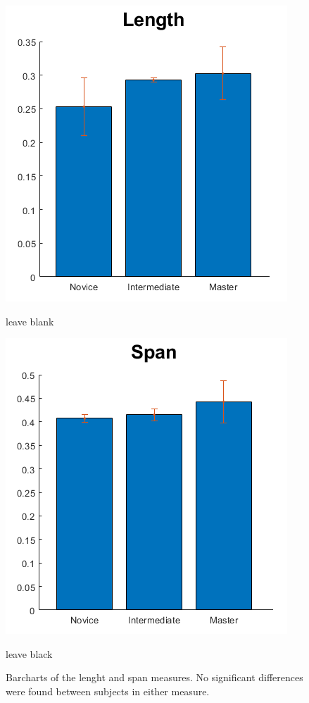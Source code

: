 \begin{figure}[H]
	\hfill
	{%
		\begin{minipage}{0.46\linewidth}
			\includegraphics[width=\linewidth]{figures/Length}
			\caption{leave blank}
			\label{fig:Length}
		\end{minipage}
	}\hfill
	{%
		\begin{minipage}{0.46\linewidth}
			\includegraphics[width=\linewidth]{figures/Span}
			\caption{leave black}
			\label{fig:Span}
		\end{minipage}
	}%
	\caption{Barcharts of the lenght and span measures. No significant differences were found between subjects in either measure.}
\end{figure}

